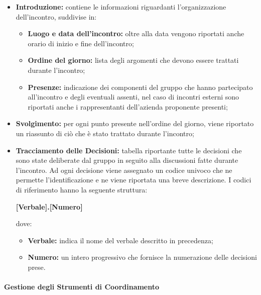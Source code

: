 				\begin{itemize}
					\item \textbf{Introduzione:} contiene le informazioni riguardanti l'organizzazione dell'incontro, suddivise in:
					\begin{itemize}
						\item \textbf{Luogo e data dell'incontro:} oltre alla data vengono riportati anche orario di inizio e fine dell'incontro;
						\item \textbf{Ordine del giorno:} lista degli argomenti che devono essere trattati durante l'incontro;
						\item \textbf{Presenze:} indicazione dei componenti del gruppo che hanno partecipato all'incontro e degli eventuali assenti, nel caso di incontri esterni sono riportati anche i rappresentanti dell'azienda proponente presenti;
					\end{itemize}
					\item \textbf{Svolgimento:} per ogni punto presente nell'ordine del giorno, viene riportato un riassunto di ciò che è stato trattato durante l'incontro;
					\item \textbf{Tracciamento delle Decisioni:} tabella riportante tutte le decisioni che sono state deliberate dal gruppo in seguito alla discussioni fatte durante l'incontro. Ad ogni decisione viene assegnato un codice univoco che ne permette l'identificazione e ne viene riportata una breve descrizione. I codici di riferimento hanno la seguente struttura:
					\begin{center}
						\textbf{[Verbale].[Numero]}
					\end{center}
					dove:
					\begin{itemize}
						\item \textbf{Verbale:} indica il nome del verbale descritto in precedenza;
						\item \textbf{Numero:} un intero progressivo che fornisce la numerazione delle decisioni prese.
					\end{itemize}
				\end{itemize}
		
		\paragraph{Gestione degli Strumenti di Coordinamento}
		
